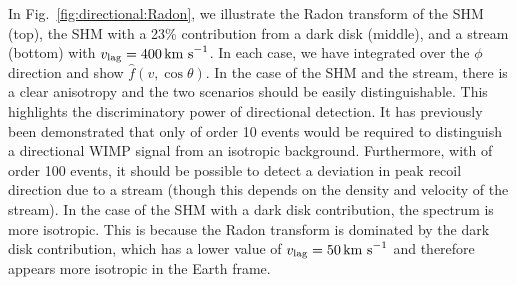 In Fig.~\ref{fig:directional:Radon}, we illustrate the Radon transform of the SHM (top), the SHM with a 23\% contribution from a dark disk (middle), and a stream (bottom) with $v_\textrm{lag} = 400 \,\textrm{km s}^{-1}$. In each case, we have integrated over the $\phi$ direction and show $\hat{f}(v, \cos\theta)$. In the case of the SHM and the stream, there is a clear anisotropy and the two scenarios should be easily distinguishable. This highlights the discriminatory power of directional detection. It has previously been demonstrated that only of order 10 events would be required to distinguish a directional WIMP signal from an isotropic background. Furthermore, with of order 100 events, it should be possible to detect a deviation in peak recoil direction due to a stream \cite{Morgan:2005} (though this depends on the density and velocity of the stream). In the case of the SHM with a dark disk contribution, the spectrum is more isotropic. This is because the Radon transform is dominated by the dark disk contribution, which has a lower value of $v_\textrm{lag} = 50 \,\textrm{km s}^{-1}$ and therefore appears more isotropic in the Earth frame.

